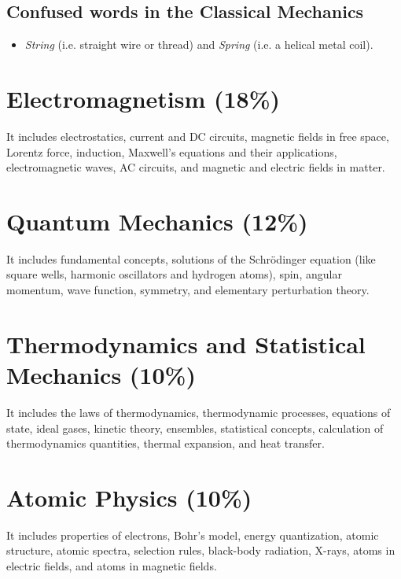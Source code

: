 \documentclass[12pt,a4paper]{article}
\begin{document}
\subsection{Confused words in the Classical Mechanics}

\begin{itemize}
\item \emph{String} (i.e. straight wire or thread) and \emph{Spring} (i.e. a helical metal coil).
\end{itemize}
\section{Electromagnetism (18\%)}

It includes electrostatics, current and DC circuits, magnetic fields in free space, Lorentz force, induction, Maxwell's equations and their applications, electromagnetic waves, AC circuits, and magnetic and electric fields in matter.

\section{Quantum Mechanics (12\%)}

It includes fundamental concepts, solutions of the Schr\"{o}dinger equation (like square wells, harmonic oscillators and hydrogen atoms), spin, angular momentum, wave function, symmetry, and elementary perturbation theory.


\section{Thermodynamics and Statistical Mechanics (10\%)}

It includes the laws of thermodynamics, thermodynamic processes, equations of state, ideal gases, kinetic theory, ensembles, statistical concepts, calculation of thermodynamics quantities, thermal expansion, and heat transfer.


\section{Atomic Physics (10\%)}

It includes properties of electrons, Bohr's model, energy quantization, atomic structure, atomic spectra, selection rules, black-body radiation, X-rays, atoms in electric fields, and atoms in magnetic fields.
\end{document}
